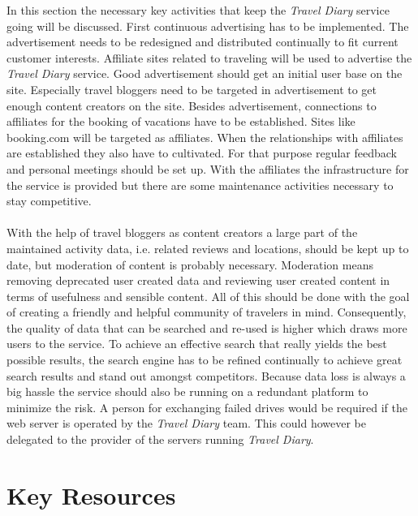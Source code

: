 \documentclass[IN,english]{tumbook}
\begin{document}
In this section the necessary key activities that keep the \emph{Travel Diary} service going will be discussed. First continuous advertising has to be implemented. The advertisement needs to be redesigned and distributed continually to fit current customer interests. Affiliate sites related to traveling will be used to advertise the \emph{Travel Diary} service. Good advertisement should get an initial user base on the site. Especially travel bloggers need to be targeted in advertisement to get enough content creators on the site. Besides advertisement, connections to affiliates for the booking of vacations have to be established. Sites like booking.com will be targeted as affiliates. When the relationships with affiliates are established they also have to cultivated. For that purpose regular feedback and personal meetings should be set up. With the affiliates the infrastructure for the service is provided but there are some maintenance activities necessary to stay competitive.\\
\\
With the help of travel bloggers as content creators a large part of the maintained activity data, i.e. related reviews and locations, should be kept up to date, but moderation of content is probably necessary. Moderation means removing deprecated user created data and reviewing user created content in terms of usefulness and sensible content. All of this should be done with the goal of creating a friendly and helpful community of travelers in mind. Consequently, the quality of data that can be searched and re-used is higher which draws more users to the service. To achieve an effective search that really yields the best possible results, the search engine has to be refined continually to achieve great search results and stand out amongst competitors. Because data loss is always a big hassle the service should also be running on a redundant platform to minimize the risk. A person for exchanging failed drives would be required if the web server is operated by the \emph{Travel Diary} team. This could however be delegated to the provider of the servers running \emph{Travel Diary}.

\section{Key Resources}
\end{document}

